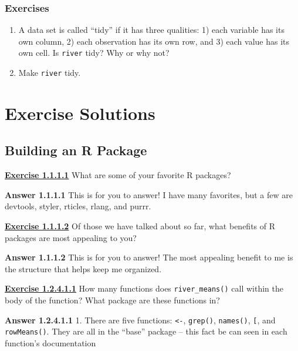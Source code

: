 \documentclass[
]{book}
\begin{document}
\hypertarget{ex-set14}{%
\subsection{Exercises}\label{ex-set14}}

\begin{enumerate}
\def\labelenumi{\arabic{enumi}.}
\item
  A data set is called ``tidy'' if it has three qualities: 1) each variable has its own column, 2) each observation has its own row, and 3) each value has its own cell. Is \texttt{river} tidy? Why or why not?
\item
  Make \texttt{river} tidy.
\end{enumerate}

\hypertarget{exercise-solutions}{%
\chapter{Exercise Solutions}\label{exercise-solutions}}

\hypertarget{building-an-r-package}{%
\section*{Building an R Package}\label{building-an-r-package}}

\textbf{\protect\hyperlink{ex-set1}{Exercise 1.1.1.1}} What are some of your favorite R packages?

\textbf{Answer 1.1.1.1} This is for you to answer! I have many favorites, but a few are devtools, styler, rticles, rlang, and purrr.

\textbf{\protect\hyperlink{ex-set1}{Exercise 1.1.1.2}} Of those we have talked about so far, what benefits of R packages are most appealing to you?

\textbf{Answer 1.1.1.2} This is for you to answer! The most appealing benefit to me is the structure that helps keep me organized.

\textbf{\protect\hyperlink{ex-set2}{Exercise 1.2.4.1.1}} How many functions does \texttt{river\_means()} call within the body of the function? What package are these functions in?

\textbf{Answer 1.2.4.1.1} 1. There are five functions: \texttt{\textless{}-}, \texttt{grep()}, \texttt{names()}, \texttt{{[}}, and \texttt{rowMeans()}. They are all in the ``base'' package -- this fact be can seen in each function's documentation
\end{document}
